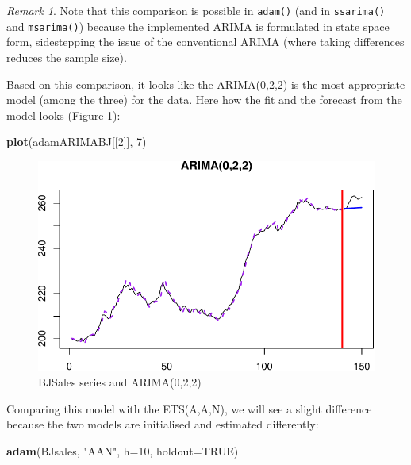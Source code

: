 \documentclass[]{book}
\newenvironment{Shaded}{\begin{snugshade}}{\end{snugshade}}
\newcommand{\DataTypeTok}[1]{\textcolor[rgb]{0.13,0.29,0.53}{#1}}
\newcommand{\DecValTok}[1]{\textcolor[rgb]{0.00,0.00,0.81}{#1}}
\newcommand{\KeywordTok}[1]{\textcolor[rgb]{0.13,0.29,0.53}{\textbf{#1}}}
\newcommand{\NormalTok}[1]{#1}
\newcommand{\OtherTok}[1]{\textcolor[rgb]{0.56,0.35,0.01}{#1}}
\newcommand{\StringTok}[1]{\textcolor[rgb]{0.31,0.60,0.02}{#1}}
\theoremstyle{definition}
\theoremstyle{definition}
\theoremstyle{definition}
\theoremstyle{definition}
\theoremstyle{remark}
\newtheorem*{remark}{Remark}
\begin{document}
\begin{remark}
Note that this comparison is possible in \texttt{adam()} (and in \texttt{ssarima()} and \texttt{msarima()}) because the implemented ARIMA is formulated in state space form, sidestepping the issue of the conventional ARIMA (where taking differences reduces the sample size).
\end{remark}

Based on this comparison, it looks like the ARIMA(0,2,2) is the most appropriate model (among the three) for the data. Here how the fit and the forecast from the model looks (Figure \ref{fig:adamARIMAPlotBJSales}):

\begin{Shaded}
\begin{Highlighting}[]
\KeywordTok{plot}\NormalTok{(adamARIMABJ[[}\DecValTok{2}\NormalTok{]], }\DecValTok{7}\NormalTok{)}
\end{Highlighting}
\end{Shaded}

\begin{figure}
\centering
\includegraphics{Svetunkov--2022----ADAM_files/figure-latex/adamARIMAPlotBJSales-1.pdf}
\caption{\label{fig:adamARIMAPlotBJSales}BJSales series and ARIMA(0,2,2)}
\end{figure}

Comparing this model with the ETS(A,A,N), we will see a slight difference because the two models are initialised and estimated differently:

\begin{Shaded}
\begin{Highlighting}[]
\KeywordTok{adam}\NormalTok{(BJsales, }\StringTok{"AAN"}\NormalTok{, }\DataTypeTok{h=}\DecValTok{10}\NormalTok{, }\DataTypeTok{holdout=}\OtherTok{TRUE}\NormalTok{)}
\end{Highlighting}
\end{Shaded}
\end{document}
